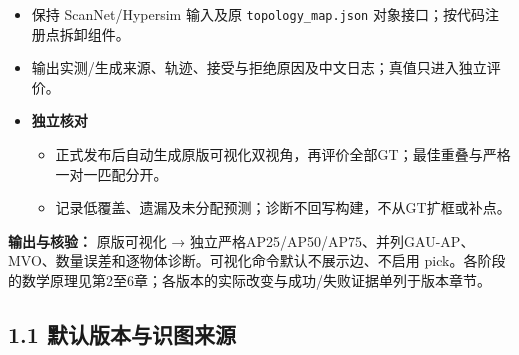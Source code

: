 \documentclass[UTF8,fontset=fandol]{ctexart}
\begin{document}
\begin{itemize}
\begin{itemize}
\begin{itemize}
\item 保持 ScanNet/Hypersim 输入及原 \texttt{topology\_\allowbreak{}map.\allowbreak{}json} 对象接口；按代码注册点拆卸组件。


\item 输出实测/生成来源、轨迹、接受与拒绝原因及中文日志；真值只进入独立评价。


\item \textbf{独立核对}


\begin{itemize}
\item 正式发布后自动生成原版可视化双视角，再评价全部GT；最佳重叠与严格一对一匹配分开。


\item 记录低覆盖、遗漏及未分配预测；诊断不回写构建，不从GT扩框或补点。

\end{itemize}
\end{itemize}
\end{itemize}
\end{itemize}


\textbf{输出与核验：} 原版可视化 → 独立严格AP25/AP50/AP75、并列GAU-AP、MVO、数量误差和逐物体诊断。可视化命令默认不展示边、不启用 pick。各阶段的数学原理见第2至6章；各版本的实际改变与成功/失败证据单列于版本章节。



\subsection*{1.1 默认版本与识图来源}
\end{document}
